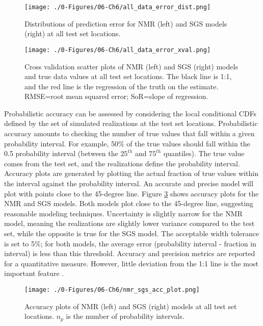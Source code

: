 \begin{figure}[htb!]
    \centering
    \texttt{[image: ./0-Figures/06-Ch6/all\_data\_error\_dist.png]}
    \caption{Distributions of prediction error for \gls{NMR} (left) and \gls{SGS} models (right) at all test set locations. }
    \label{fig:all_data_error_dist}
\end{figure}

\begin{figure}[htb!]
    \centering
    \texttt{[image: ./0-Figures/06-Ch6/all\_data\_error\_xval.png]}
    \caption{Cross validation scatter plots of  \gls{NMR} (left) and \gls{SGS} (right) models and true data values at all test set locations. The black line is 1:1, and the red line is the regression of the truth on the estimate. RMSE=root mean squared error; SoR=slope of regression.}
    \label{fig:all_data_error_xval}
\end{figure}

Probabilistic accuracy can be assessed by considering the local conditional \glspl{CDF} defined by the set of simulated realizations at the test set locations. Probabilistic accuracy amounts to checking the number of true values that fall within a given probability interval. For example, 50\% of the true values should fall within the 0.5 probability interval (between the $25^{th}$ and  $75^{th}$ quantiles). The true value comes from the test set, and the realizations define the probability interval. Accuracy plots are generated by plotting the actual fraction of true values within the interval against the probability interval. An accurate and precise model will plot with points close to the 45-degree line. Figure \ref{fig:nmr_sgs_acc_plot} shows accuracy plots for the \gls{NMR} and \gls{SGS} models. Both models plot close to the 45-degree line, suggesting reasonable modeling techniques. Uncertainty is slightly narrow for the \gls{NMR} model, meaning the realizations are slightly lower variance compared to the test set, while the opposite is true for the \gls{SGS} model. The acceptable width tolerance is set to 5\%; for both models, the average error (probability interval - fraction in interval) is less than this threshold. Accuracy and precision metrics are reported for a quantitative measure. However, little deviation from the 1:1 line is the most important feature \citep{deutsch2010display} .

\begin{figure}[htb!]
    \centering
    \texttt{[image: ./0-Figures/06-Ch6/nmr\_sgs\_acc\_plot.png]}
    \caption{Accuracy plots of  \gls{NMR} (left) and \gls{SGS} (right) models at all test set locations. $n_{p}$ is the number of probability intervals. }
    \label{fig:nmr_sgs_acc_plot}
\end{figure}

